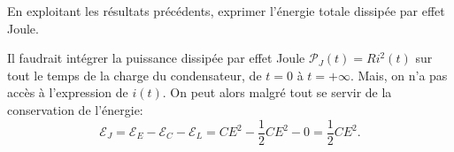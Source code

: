 
\begin{enonce}
En exploitant les résultats précédents, exprimer l'énergie totale dissipée par effet Joule.

\end{enonce}


\begin{corrige}
Il faudrait intégrer la puissance dissipée par effet Joule $\mathcal{P}_J(t)=Ri^2(t)$ sur tout le temps de la charge du condensateur, de $t=0$ à $t=+\infty$.  Mais, on n'a pas accès à l'expression de $i(t)$. On peut alors malgré tout se servir 
de la conservation de l'énergie:
\[
\mathcal{E}_J=\mathcal{E}_E-\mathcal{E}_C-\mathcal{E}_L= CE^2-\frac{1}{2} CE^2-0=\frac{1}{2} CE^2.
\]
\end{corrige}



\finEntrainement




\newpage






